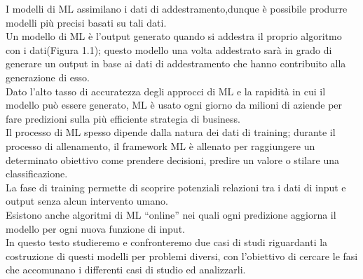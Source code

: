 \documentclass[../tesi.tex]{subfiles}
\begin{document}
I modelli di ML assimilano i dati di addestramento,dunque è possibile produrre modelli più precisi basati su tali dati.\\
Un modello di ML è l’output generato quando si addestra il proprio algoritmo con i dati(Figura 1.1); questo modello una volta addestrato sarà in grado di generare un output in base ai dati di addestramento che hanno contribuito alla generazione di esso.\\
Dato l’alto tasso di accuratezza degli approcci di ML e la rapidità in cui il modello può essere generato, ML è usato ogni giorno da milioni di aziende per fare predizioni sulla più efficiente strategia di business.\\
Il processo di ML spesso dipende dalla natura dei dati di training; durante il processo di allenamento, il framework ML è allenato per raggiungere un determinato obiettivo come prendere decisioni, predire un valore o stilare una classificazione.\\
La fase di training permette di scoprire potenziali relazioni tra i dati di input e output senza alcun intervento umano.\\
Esistono anche algoritmi di ML ``online'' nei quali ogni predizione aggiorna il modello per ogni nuova funzione di input.\\
In questo testo studieremo e confronteremo due casi di studi riguardanti la costruzione di questi modelli per problemi diversi, con l’obiettivo di cercare le fasi che accomunano i differenti casi di studio ed analizzarli. 
\end{document}
